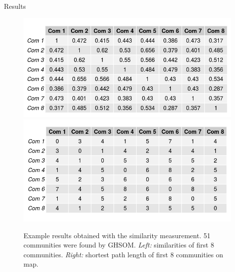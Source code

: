 \documentclass{beamer}
\begin{document}
	\begin{frame}{Results}
		
		\begin{figure}
			\centering
			\includegraphics[scale=0.4]{wang_01.png}
			\includegraphics[scale=0.4]{shortest_path_01.png}
			\caption{Example results obtained with the \cite{wang2007new} similarity measurement. 51 communities were found by GHSOM. \textit{Left:} similarities of first 8 communities. \textit{Right:} shortest path length of first 8 communities on map.}
		\end{figure}
		
	\end{frame}	
	
\end{document}
